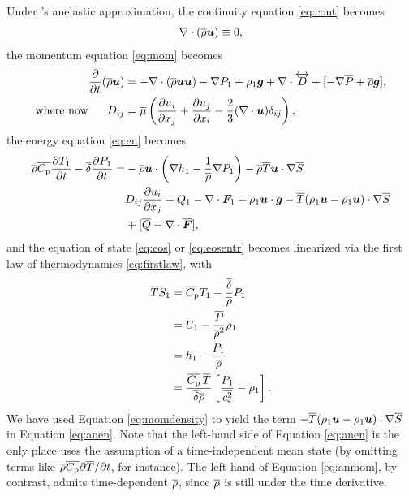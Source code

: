\documentclass[12pt]{article}
\newcommand{\vecf}{\bm{F}}
\begin{document}
	Under \citet{Gough1969}'s anelastic approximation, the continuity equation \eqref{eq:cont} becomes
	\begin{align}\label{eq:ancont}
		\nabla\cdot(\overline{\rho}\bm{u})\equiv 0,
	\end{align}
	the momentum equation \eqref{eq:mom} becomes 
	\begin{subequations}\label{eq:anmom}
	\begin{align}
		\frac{\partial}{\partial t}(\overline{\rho}\bm{u})&=-\nabla\cdot(\overline{\rho}\bm{u}\bm{u}) - \nabla P_1 +\rho_1\bm{g} +\nabla\cdot \overleftrightarrow{D}+[-\nabla\overline{P} + \overline{\rho}\bm{g}],\label{eq:anmommain}\\
		\text{where now}\ \ \ \ \  D_{ij}& = \overline{\mu}\left(\frac{\partial u_i}{\partial x_j} + \frac{\partial u_j}{\partial x_i} - \frac{2}{3}(\nabla\cdot\bm{u})\delta_{ij}\right)\label{eq:anmomvisc},
	\end{align}
	\end{subequations}
	the energy equation \eqref{eq:en} becomes 
	\begin{align}\label{eq:anen}
		\rhoover\cpover\pderiv{\tmpone}{t} - \deltaover\pderiv{\prsone}{t} = &-\rhoover\vecu\cdot\left(\nabla \enthone-\frac{1}{\rhoover}\nabla \prsone\right) - \rhoover \tmpover \ugrad \entrover\nonumber\\
		& D_{ij}\pderiv{u_i}{x_j} + Q _1- \Div\vecf_1 -\rhoone\vecu\cdot\vecg - \tmpover(\rhoone\vecu-\overline{\rhoone\vecu})\cdot\nabla\entrover\nonumber\\
		&+ [\heatover - \Div\overline{\vecf}],
	\end{align}
  and the equation of state \eqref{eq:eos} or \eqref{eq:eosentr} becomes linearized via the first law of thermodynamics \eqref{eq:firstlaw}, with
  \begin{subequations}\label{eq:anfirstlawpert}
  \begin{align}
  	\overline{T} S_1 &= \overline{C_{\rm{p}}} T_1 - \frac{\overline{\delta}}{\overline{\rho}} P_1\label{eq:anfirstlawperttp}\\
  	&= U_1 - \frac{\overline{P}}{\overline{\rho}^2}\rho_1 \label{eq:linu}\\
  	&= h_1 - \frac{P_1}{\overline{\rho}}\label{eq:h1}\\
  	&= \frac{\overline{C_{\rm{p}}}\, \overline{T}}{\overline{\delta}\overline{\rho}}\left[\frac{P_1}{\overline{c_{\rm s}^2}}-\rho_1\right].
  \end{align}
  \end{subequations}
  We have used Equation \eqref{eq:momdensity} to yield the term $- \overline{T}(\rho_1\bm{u}-\overline{\rho_1\bm{u}})\cdot\nabla\overline{S}$ in Equation \eqref{eq:anen}. Note that the left-hand side of Equation \eqref{eq:anen} is the only place \citet{Gough1969} uses the assumption of a time-independent mean state (by omitting terms like $\overline{\rho}\overline{C_{\rm{p}}}\partial\overline{T}/\partial t$, for instance). The left-hand of Equation \eqref{eq:anmom}, by contrast, admits time-dependent $\overline{\rho}$, since $\overline{\rho}$ is still under the time derivative. 
  
\end{document}
